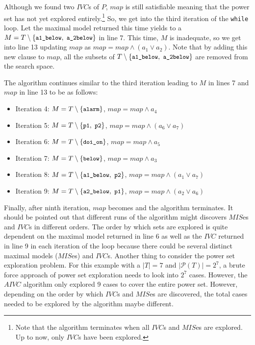 Although we found two $IVC$s of $P$, $map$ is still satisfiable meaning that the power set has not yet explored entirely.\footnote{Note that the algorithm terminates when all $IVC$s and $MIS$es are explored. Up to now, only $IVC$s have been explored.} So, we get into the third iteration of the \texttt{while} loop. Let the maximal model returned this time 
yields to a 
$M = T \setminus \{ \small{ \texttt{a1\_below},~\texttt{a\_2below}}\}$
 in line 7. 
This time, $M$ is inadequate, so we get into line 13 updating $map$ as 
$map = map \wedge (a_1 \vee a_2)$. 
Note that by adding this new clause to $map$, 
all the subsets of $T \setminus \{ \small{ \texttt{a1\_below},~\texttt{a\_2below}}\}$ 
are removed from the search space.

The algorithm continues similar to the third iteration leading to $M$ in lines 7 and $map$ in line 13 to be as follows:
\begin{itemize}
  \item Iteration 4:  $M = T \setminus \{ \small{ \texttt{alarm}}\}$, $map = map \wedge a_4$
 
  \item Iteration 5: $M = T \setminus \{ \small{ \texttt{p1},~\texttt{p2}}\}$, $map = map \wedge (a_6 \vee a_7)$
 
  \item Iteration 6: $M = T \setminus \{ \small{ \texttt{doi\_on}}\}$, $map = map \wedge a_5$
 
  \item Iteration 7: $M = T \setminus \{ \small{ \texttt{below}}\}$, $map = map \wedge a_3$
 
  \item Iteration 8: $M = T \setminus \{ \small{ \texttt{a1\_below},~\texttt{p2}}\}$, $map = map \wedge (a_1 \vee a_7)$
      
  \item Iteration 9: $M = T \setminus \{ \small{ \texttt{a2\_below},~\texttt{p1}}\}$, $map = map \wedge (a_2 \vee a_6)$
\end{itemize}
Finally, after ninth iteration, $map$ becomes \unsat and the algorithm terminates. 
It should be pointed out that different runs of the algorithm might discovers $MIS$es and $IVC$s in different orders. The order by which sets are explored is 
quite dependent on the maximal model returned in line 6 as well as the $IVC$ returned in line 9 in each iteration of the loop because there could be several distinct maximal models ($MIS$es) and $IVC$s. Another thing to consider the power set exploration problem. For this example with a $|T| = 7$ and $|\mathcal{P}(T)| = 2^7$, a brute force approach of power set exploration needs to look into  $2^7$ cases. However, the $AIVC$ algorithm only explored 9 cases to cover the entire power set. However, depending on the order by which $IVC$s and $MIS$es are discovered, the total cases needed to be explored by the algorithm maybe different.

